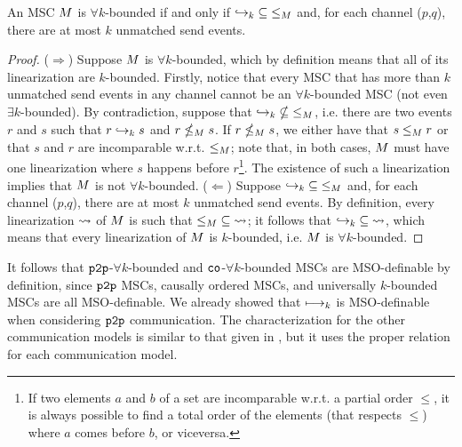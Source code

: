 \begin{proposition}
	An MSC $M$ is $\forall k$-bounded if and only if $\hookrightarrow_{k} \;\subseteq\; \le_M$ and, for each channel ($p$,$q$), there are at most $k$ unmatched send events.
\end{proposition}
\begin{proof}
	($\Rightarrow$) Suppose $M$ is $\forall k$-bounded, which by definition means that all of its linearization are $k$-bounded. Firstly, notice that every MSC that has more than $k$ unmatched send events in any channel cannot be an $\forall k$-bounded MSC (not even $\exists k$-bounded). By contradiction, suppose that $\hookrightarrow_{k} \;\nsubseteq\; \le_M$, i.e. there are two events $r$ and $s$ such that $r \hookrightarrow_{k} s$ and $r \nleq_M s$. If $r \nleq_M s$, we either have that $s \le_M r$ or that $s$ and $r$ are incomparable w.r.t. $\le_M$; note that, in both cases, $M$ must have one linearization where $s$ happens before $r$\footnote{If two elements $a$ and $b$ of a set are incomparable w.r.t. a partial order $\le$, it is always possible to find a total order of the elements (that respects $\le$) where $a$ comes before $b$, or viceversa.}. The existence of such a linearization implies that $M$ is not $\forall k$-bounded.
	($\Leftarrow$) Suppose $\hookrightarrow_{k} \;\subseteq\; \le_M$ and, for each channel ($p$,$q$), there are at most $k$ unmatched send events. By definition, every linearization $\rightsquigarrow$ of $M$ is such that $\le_M \;\subseteq\; \rightsquigarrow$; it follows that $\hookrightarrow_{k} \;\subseteq\; \rightsquigarrow$, which means that every linearization of $M$ is $k$-bounded, i.e. $M$ is $\forall k$-bounded.
\end{proof}

It follows that $\mathtt{p2p}$-$\forall k$-bounded and $\mathtt{co}$-$\forall k$-bounded MSCs are MSO-definable by definition, since $\mathtt{p2p}$ MSCs, causally ordered MSCs, and universally $k$-bounded MSCs are all MSO-definable. We already showed that $\longmapsto_k$ is MSO-definable when considering $\mathtt{p2p}$ communication. The characterization for the other communication models is similar to that given in \cite{DBLP:conf/fossacs/LohreyM02}, but it uses the proper relation for each communication model.

